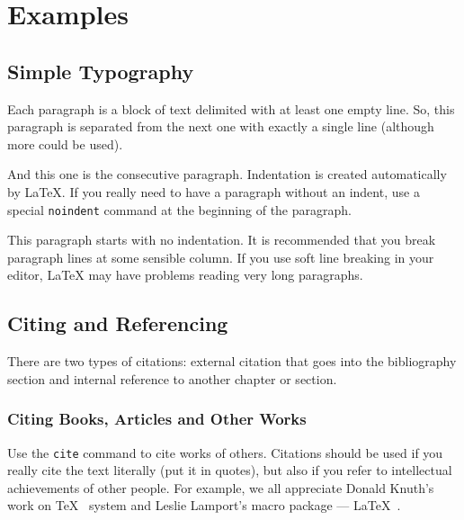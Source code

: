 
\chapter{Examples}

\section{Simple Typography}

Each paragraph is a block of text delimited with at least one empty line. So, this
paragraph is separated from the next one with exactly a single line (although
more could be used).

And this one is the consecutive paragraph. Indentation is created automatically by
\LaTeX{}. If you really need to have a paragraph without an indent, use a special
\texttt{noindent} command at the beginning of the paragraph.

\noindent This paragraph starts with no indentation. It is recommended that you break
paragraph lines at some sensible column. If you use soft line breaking in your editor,
\LaTeX{} may have problems reading very long paragraphs.


\section{Citing and Referencing}

There are two types of citations: external citation that goes into the bibliography section
and internal reference to another chapter or section.

\subsection{Citing Books, Articles and Other Works}

Use the \texttt{cite} command to cite works of others. Citations should be used if you really cite
the text literally (put it in quotes), but also if you refer to intellectual achievements of other
people. For example, we all appreciate Donald Knuth's work on \TeX{}~\cite{Knuth:ct-a} system and Leslie
Lamport's macro package --- \LaTeX{}~\cite{Lamport:LDP85}. 
